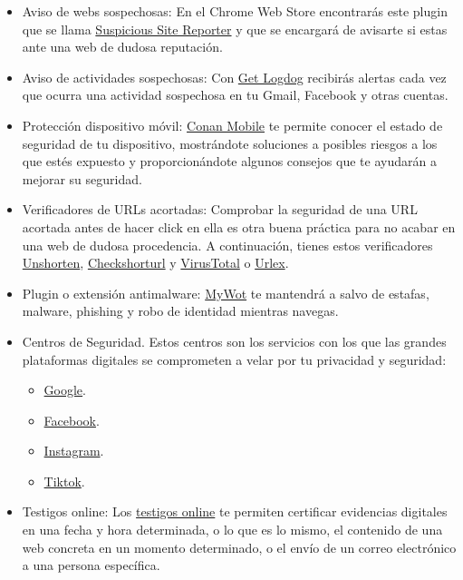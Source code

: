 \documentclass[
  a4paper,
  openany]{book}
\begin{document}
\begin{itemize}
\item
  Aviso de webs sospechosas: En el Chrome Web Store encontrarás este plugin que se llama \href{https://chrome.google.com/webstore/detail/suspicious-site-reporter/jknemblkbdhdcpllfgbfekkdciegfboi}{Suspicious Site Reporter} y que se encargará de avisarte si estas ante una web de dudosa reputación.
\item
  Aviso de actividades sospechosas: Con \href{https://getlogdog.com/}{Get Logdog} recibirás alertas cada vez que ocurra una actividad sospechosa en tu Gmail, Facebook y otras cuentas.
\item
  Protección dispositivo móvil: \href{https://www.osi.es/es/conan-mobile}{Conan Mobile} te permite conocer el estado de seguridad de tu dispositivo, mostrándote soluciones a posibles riesgos a los que estés expuesto y proporcionándote algunos consejos que te ayudarán a mejorar su seguridad.
\item
  Verificadores de URLs acortadas: Comprobar la seguridad de una URL acortada antes de hacer click en ella es otra buena práctica para no acabar en una web de dudosa procedencia. A continuación, tienes estos verificadores \href{https://unshorten.it/}{Unshorten}, \href{https://checkshorturl.com/}{Checkshorturl} y \href{https://www.virustotal.com/gui/home/url}{VirusTotal} o \href{https://urlex.org/}{Urlex}.
\item
  Plugin o extensión antimalware: \href{https://www.mywot.com/}{MyWot} te mantendrá a salvo de estafas, malware, phishing y robo de identidad mientras navegas.
\item
  Centros de Seguridad. Estos centros son los servicios con los que las grandes plataformas digitales se comprometen a velar por tu privacidad y seguridad:

  \begin{itemize}
  \item
    \href{https://safety.google}{Google}.
  \item
    \href{https://es-es.facebook.com/safety}{Facebook}.
  \item
    \href{https://about.instagram.com/es-la/community/safety}{Instagram}.
  \item
    \href{https://www.tiktok.com/safety?lang=es}{Tiktok}.
  \end{itemize}
\item
  Testigos online: Los \href{https://www.osi.es/es/actualidad/blog/2022/01/26/testigos-online-y-obtencion-de-pruebas-te-explicamos-su-utilidad}{testigos online} te permiten certificar evidencias digitales en una fecha y hora determinada, o lo que es lo mismo, el contenido de una web concreta en un momento determinado, o el envío de un correo electrónico a una persona específica.
\end{itemize}
\end{document}
